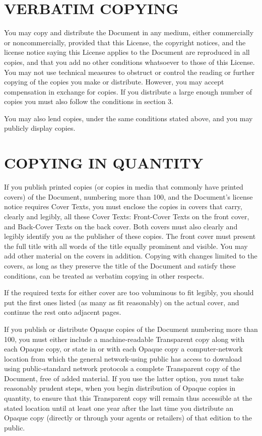 \documentclass[oneside]{stacks-project-book}
\theoremstyle{plain}
\theoremstyle{definition}
\theoremstyle{remark}
\numberwithin{equation}{subsection}
\begin{document}
\section{VERBATIM COPYING}
\label{fdl-section-verbatim-copying}
\hypertarget{05BH}{}
\reversemarginpar{}

You may copy and distribute the Document in any medium, either
commercially or noncommercially, provided that this License, the
copyright notices, and the license notice saying this License applies
to the Document are reproduced in all copies, and that you add no other
conditions whatsoever to those of this License.  You may not use
technical measures to obstruct or control the reading or further
copying of the copies you make or distribute.  However, you may accept
compensation in exchange for copies.  If you distribute a large enough
number of copies you must also follow the conditions in section 3.

You may also lend copies, under the same conditions stated above, and
you may publicly display copies.


\section{COPYING IN QUANTITY}
\label{fdl-section-copying-in-quantity}
\hypertarget{05BI}{}
\reversemarginpar{}


If you publish printed copies (or copies in media that commonly have
printed covers) of the Document, numbering more than 100, and the
Document's license notice requires Cover Texts, you must enclose the
copies in covers that carry, clearly and legibly, all these Cover
Texts: Front-Cover Texts on the front cover, and Back-Cover Texts on
the back cover.  Both covers must also clearly and legibly identify
you as the publisher of these copies.  The front cover must present
the full title with all words of the title equally prominent and
visible.  You may add other material on the covers in addition.
Copying with changes limited to the covers, as long as they preserve
the title of the Document and satisfy these conditions, can be treated
as verbatim copying in other respects.

If the required texts for either cover are too voluminous to fit
legibly, you should put the first ones listed (as many as fit
reasonably) on the actual cover, and continue the rest onto adjacent
pages.

If you publish or distribute Opaque copies of the Document numbering
more than 100, you must either include a machine-readable Transparent
copy along with each Opaque copy, or state in or with each Opaque copy
a computer-network location from which the general network-using
public has access to download using public-standard network protocols
a complete Transparent copy of the Document, free of added material.
If you use the latter option, you must take reasonably prudent steps,
when you begin distribution of Opaque copies in quantity, to ensure
that this Transparent copy will remain thus accessible at the stated
location until at least one year after the last time you distribute an
Opaque copy (directly or through your agents or retailers) of that
edition to the public.
\end{document}
